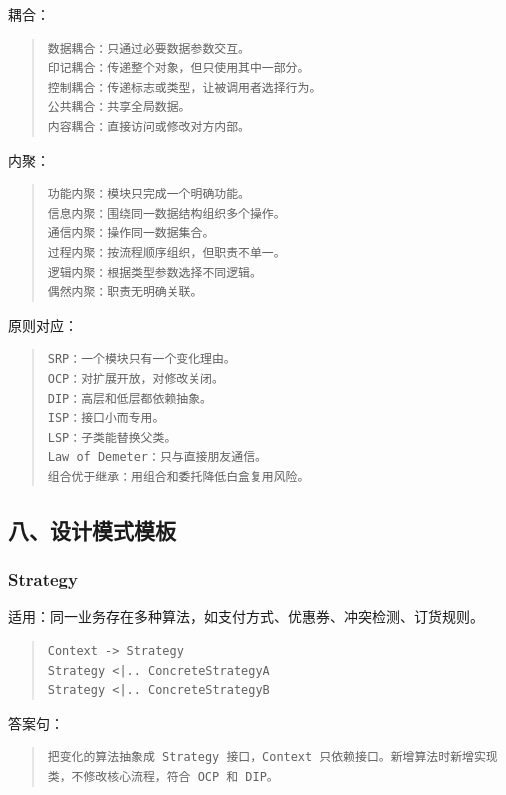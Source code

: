 \documentclass[UTF8,zihao=-4]{ctexart}
\begin{document}
耦合：


\begin{quote}
\footnotesize
\begin{verbatim}
数据耦合：只通过必要数据参数交互。
印记耦合：传递整个对象，但只使用其中一部分。
控制耦合：传递标志或类型，让被调用者选择行为。
公共耦合：共享全局数据。
内容耦合：直接访问或修改对方内部。
\end{verbatim}
\end{quote}


内聚：


\begin{quote}
\footnotesize
\begin{verbatim}
功能内聚：模块只完成一个明确功能。
信息内聚：围绕同一数据结构组织多个操作。
通信内聚：操作同一数据集合。
过程内聚：按流程顺序组织，但职责不单一。
逻辑内聚：根据类型参数选择不同逻辑。
偶然内聚：职责无明确关联。
\end{verbatim}
\end{quote}


原则对应：


\begin{quote}
\footnotesize
\begin{verbatim}
SRP：一个模块只有一个变化理由。
OCP：对扩展开放，对修改关闭。
DIP：高层和低层都依赖抽象。
ISP：接口小而专用。
LSP：子类能替换父类。
Law of Demeter：只与直接朋友通信。
组合优于继承：用组合和委托降低白盒复用风险。
\end{verbatim}
\end{quote}


\subsection{八、设计模式模板}


\subsubsection{Strategy}


适用：同一业务存在多种算法，如支付方式、优惠券、冲突检测、订货规则。


\begin{quote}
\footnotesize
\begin{verbatim}
Context -> Strategy
Strategy <|.. ConcreteStrategyA
Strategy <|.. ConcreteStrategyB
\end{verbatim}
\end{quote}


答案句：


\begin{quote}
\footnotesize
\begin{verbatim}
把变化的算法抽象成 Strategy 接口，Context 只依赖接口。新增算法时新增实现类，不修改核心流程，符合 OCP 和 DIP。
\end{verbatim}
\end{quote}
\end{document}

